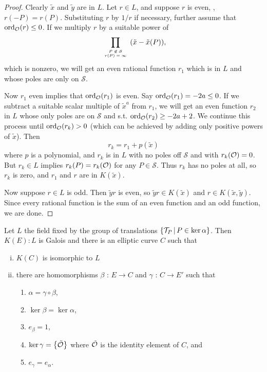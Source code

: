 \begin{proof}
Clearly $\tilde{x}$ and $\tilde{y}$ are in $L$. Let $r\in L$, and suppose $r$ is even, \ie, $r(-P)= r(P)$. Substituting $r$ by $1/r$ if necessary, further assume that $\operatorname{ord}_{\mathcal{O}} (r)\leq 0$. If we multiply $r$ by a suitable power of
$$
\prod_{\tiny \begin{array}{c}P\not\in \mathcal{S}\\ r(P)=\infty\end{array}}(\tilde{x}-\tilde{x}(P)),
$$
which is nonzero, we will get an even rational function $r_{1}$ which is in $L$ and whose poles are only on $\mathcal{S}$.

Now $r_{1}$ even implies that $\operatorname{ord}_{\mathcal{O}}(r_{1})$ is even. Say $\operatorname{ord}_{\mathcal{O}}(r_{1})=-2 a \leq 0$. If we subtract a suitable scalar multiple of $\tilde{x}^{a}$ from $r_{1}$, we will get an even function $r_2$ in $L$ whose only poles are on $\mathcal{S}$ and s.t. $\operatorname{ord}_{\mathcal{O}}(r_2) \geq -2a+2$. We continue this process until $\operatorname{ord}_{\mathcal{O}}(r_k) > 0$ (which can be achieved by adding only positive powers of $\tilde{x}$). Then
$$
r_{k}=r_1 + p(\tilde{x})
$$
where $p$ is a polynomial, and $r_k$ is in $L$ with no poles off $\mathcal{S}$ and with $r_k(\mathcal{O})=0$. But $r_{k}\in L$ implies $r_{k}(P)=r_{k}(\mathcal{O})$ for any $P\in \mathcal{S}$. Thus $r_{k}$ has no poles at all, so $r_{k}$ is zero, and $r_{1}$ and $r$ are in $K(\tilde{x})$.

Now suppose $r\in L$ is odd. Then $\tilde{y}r$ is even, so $\tilde{y}r\in K(\tilde{x})$ and $r\in K(\tilde{x},\tilde{y})$. Since every rational function is the sum of an even function and an odd function, we are done.
\end{proof}

\begin{theo}
\label{t2.6.7}
Let $L$ the field fixed by the group of translations $\{\mathcal{T}_{P}\, |\, P\in \ker \alpha\}$. Then $K(E):L$ is Galois and there is an elliptic curve $C$ such that
\begin{enumerate}[(i)]
\item
$K(C)$ is isomorphic to $L$
\item
there are homomorphisms $\beta$ : $E\rightarrow C$ and $\gamma$ : $C\rightarrow E'$ such that
\begin{enumerate}
\item
$\alpha =\gamma\circ\beta$,
\item
$\ker \beta=\ker \alpha$,
\item
$e_{\beta}=1$,
\item
$\ker \gamma=\left \{\tilde{\mathcal{O}}\right\}$ where $\tilde{\mathcal{O}}$ is the identity element of $C$, and
\item
$e_{\gamma}=e_{\alpha}$.
\end{enumerate}
\end{enumerate}
\end{theo}

